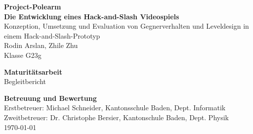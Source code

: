 \documentclass[10pt]{article}
\newcommand{\game}[1]{\textit{#1}}   %
\begin{document}

\begin{titlepage}
    \begin{center}
        \vspace*{2cm}

        \textbf{\Huge{Project-Polearm}} \\ [2em]
        \textbf{\Large Die Entwicklung eines Hack-and-Slash Videospiels} \\ [0.6em]
        \large{Konzeption, Umsetzung und Evaluation von Gegnerverhalten und Leveldesign in einem Hack-and-Slash-Prototyp} \\ [2em]

        \Large{Rodin Arslan, Zhile Zhu} \\ [0.5em]
        \large{Klasse G23g}

        \vspace{3cm}

        \LARGE{\textbf{Maturitätsarbeit}} \\ [0.3em]
        \Large{Begleitbericht}

        \vfill

        \Large{\textbf{Betreuung und Bewertung}} \\ [0.5em]
        \large{Erstbetreuer: Michael Schneider, Kantonsschule Baden, Dept. Informatik} \\
        \large{Zweitbetreuer: Dr. Christophe Bersier, Kantonschule Baden, Dept. Physik} \\

        \vspace{2cm}
        \large{\today}
    \end{center}
\end{titlepage}

\newpage



\begin{abstract}
Die vorliegende Maturitätsarbeit beschäftigt sich mit der Leitfrage, wie Gegnerverhalten und Gegnerplatzierung in einem 3D-Hack-and-Slash-Prototyp konzipiert sein müssen, damit ein Kampfabschnitt mit nachvollziehbarem Spielfluss, angemessener Schwierigkeit und befriedigendem Spielgefühl entsteht.

Zur Konzipierung des eigenen Prototyps wurde das Gegnerverhalten in \textit{Ninja Gaiden Sigma} und \textit{NieR: Automata} mithilfe des MDA-Frameworks analysiert. Für die Gegnerplatzierung und das Leveldesign wurde Fachliteratur ausgewertet. Aus beidem wurden konkrete Designmittel gewonnen.

Aus dieser Recherche wurden acht Designvorschläge abgeleitet, welche die Leitfrage beantworten sollen (z.\,B. Begrenzung gleichzeitiger Angreifer, klar telegrafierte Angriffe, Wellenstruktur mit Erholungsphasen). Diese Vorschläge wurden mit den gewonnenen Designmitteln in einem Prototyp umgesetzt, der mit der Gameengine \game{Godot} entwickelt wurde. In einem anschliessenden Playtest wurde untersucht, wie sich diese Umsetzung auf das Spielverhalten und das Spielerlebnis auswirkte. Der Playtest zeigte, dass \textcolor{red}{[Kernergebnis]}. Daraus wurden Verbesserungen für eine weitere Iteration abgeleitet.
\end{abstract}
\end{document}
